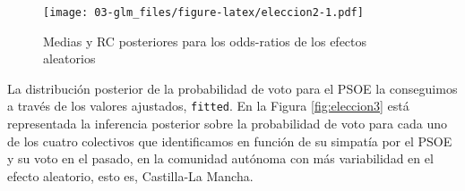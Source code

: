 \documentclass[
]{book}
\newenvironment{Shaded}{\begin{snugshade}}{\end{snugshade}}
\newcommand{\AttributeTok}[1]{\textcolor[rgb]{0.77,0.63,0.00}{#1}}
\newcommand{\DecValTok}[1]{\textcolor[rgb]{0.00,0.00,0.81}{#1}}
\newcommand{\FloatTok}[1]{\textcolor[rgb]{0.00,0.00,0.81}{#1}}
\newcommand{\FunctionTok}[1]{\textcolor[rgb]{0.00,0.00,0.00}{#1}}
\newcommand{\NormalTok}[1]{#1}
\newcommand{\OtherTok}[1]{\textcolor[rgb]{0.56,0.35,0.01}{#1}}
\newcommand{\SpecialCharTok}[1]{\textcolor[rgb]{0.00,0.00,0.00}{#1}}
\newcommand{\StringTok}[1]{\textcolor[rgb]{0.31,0.60,0.02}{#1}}
\begin{document}
\begin{Shaded}
\end{Shaded}

\begin{figure}
\centering
\texttt{[image: 03-glm\_files/figure-latex/eleccion2-1.pdf]}
\caption{\label{fig:eleccion2}Medias y RC posteriores para los odds-ratios de los efectos aleatorios}
\end{figure}

La distribución posterior de la probabilidad de voto para el PSOE la conseguimos a través de los valores ajustados, \texttt{fitted}. En la Figura \ref{fig:eleccion3} está representada la inferencia posterior sobre la probabilidad de voto para cada uno de los cuatro colectivos que identificamos en función de su simpatía por el PSOE y su voto en el pasado, en la comunidad autónoma con más variabilidad en el efecto aleatorio, esto es, Castilla-La Mancha.
\end{document}
